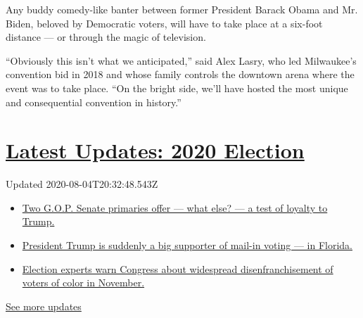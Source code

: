 Any buddy comedy-like banter between former President Barack Obama and
Mr. Biden, beloved by Democratic voters, will have to take place at a
six-foot distance --- or through the magic of television.

``Obviously this isn't what we anticipated,'' said Alex Lasry, who led
Milwaukee's convention bid in 2018 and whose family controls the
downtown arena where the event was to take place. ``On the bright side,
we'll have hosted the most unique and consequential convention in
history.''

\hypertarget{latest-updates-2020-election}{%
\section{\texorpdfstring{\href{https://www.nytimes.com/2020/08/04/us/elections/primary-election-michigan-arizona-kansas.html?action=click\&pgtype=Article\&state=default\&region=MAIN_CONTENT_1\&context=storylines_live_updates}{Latest
Updates: 2020
Election}}{Latest Updates: 2020 Election}}\label{latest-updates-2020-election}}

Updated 2020-08-04T20:32:48.543Z

\begin{itemize}
\tightlist
\item
  \href{https://www.nytimes.com/2020/08/04/us/elections/primary-election-michigan-arizona-kansas.html?action=click\&pgtype=Article\&state=default\&region=MAIN_CONTENT_1\&context=storylines_live_updates\#link-3924dd44}{Two
  G.O.P. Senate primaries offer --- what else? --- a test of loyalty to
  Trump.}
\item
  \href{https://www.nytimes.com/2020/08/04/us/elections/primary-election-michigan-arizona-kansas.html?action=click\&pgtype=Article\&state=default\&region=MAIN_CONTENT_1\&context=storylines_live_updates\#link-32b39e33}{President
  Trump is suddenly a big supporter of mail-in voting --- in Florida.}
\item
  \href{https://www.nytimes.com/2020/08/04/us/elections/primary-election-michigan-arizona-kansas.html?action=click\&pgtype=Article\&state=default\&region=MAIN_CONTENT_1\&context=storylines_live_updates\#link-6d019753}{Election
  experts warn Congress about widespread disenfranchisement of voters of
  color in November.}
\end{itemize}

\href{https://www.nytimes.com/2020/08/04/us/elections/primary-election-michigan-arizona-kansas.html?action=click\&pgtype=Article\&state=default\&region=MAIN_CONTENT_1\&context=storylines_live_updates}{See
more updates}

